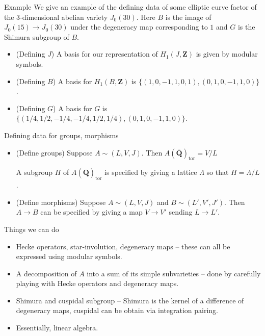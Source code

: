 \documentclass{beamer}
\newcommand{\QQbar}{\overline{\mathbf{Q}}}
\newcommand{\ZZ}{\mathbf{Z}}
\renewcommand{\ZZ}{\mathbf{Z}}
\newcommand{\tor}{\mathrm{tor}}
\begin{document}
\begin{frame}{Example}
    We give an example of the defining data of some elliptic curve factor of
    the 3-dimensional abelian variety $J_0(30)$. Here $B$ is the image of
    $J_0(15)\to J_0(30)$ under the degeneracy map corresponding to $1$ and $G$
    is the Shimura subgroup of $B$.
    \begin{itemize}
        \item
            (Defining $J$) A basis for our representation of $H_1(J, \ZZ)$ is
            given by modular symbols.
            \pause
        \item
            (Defining $B$) A basis for $H_1(B, \ZZ)$ is $\{(1,0,-1,1,0,1),
            (0,1,0,-1,1,0)\}$.
            \pause
        \item
            (Defining $G$) A basis for $G$ is $\{(1/4, 1/2, -1/4, -1/4, 1/2,
            1/4), (0,1,0,-1,1,0)\}$.
    \end{itemize}
\end{frame}

\begin{frame}{Defining data for groups, morphisms}
    \begin{itemize}
        \item
            (Define groups) Suppose $A\sim (L, V, J)$. Then
            $A(\QQbar)_\tor=V/L$

            A subgroup $H$ of
            $A(\QQbar)_\tor$ is specified by giving a lattice $\Lambda$ so that
            $H = \Lambda/L$.
        \item
            (Define morphisms) Suppose $A\sim (L, V, J)$ and $B\sim (L', V', J')$.
            Then $A\to B$ can be specified by giving a map $V\to V'$ sending
            $L\to L'$.
    \end{itemize}
\end{frame}

\begin{frame}{Things we can do}
    \begin{itemize}
        \item
            Hecke operators, star-involution, degeneracy maps -- these can all
            be expressed using modular symbols.
            \pause
        \item
            A decomposition of $A$ into a sum of its simple subvarieties --
            done by carefully playing with Hecke operators and degeneracy maps.
            \pause
        \item
            Shimura and cuspidal subgroup -- Shimura is the kernel of a
            difference of degeneracy maps, cuspidal can be obtain via
            integration pairing.
            \pause
        \item
            Essentially, linear algebra.
    \end{itemize}
\end{frame}
\end{document}
